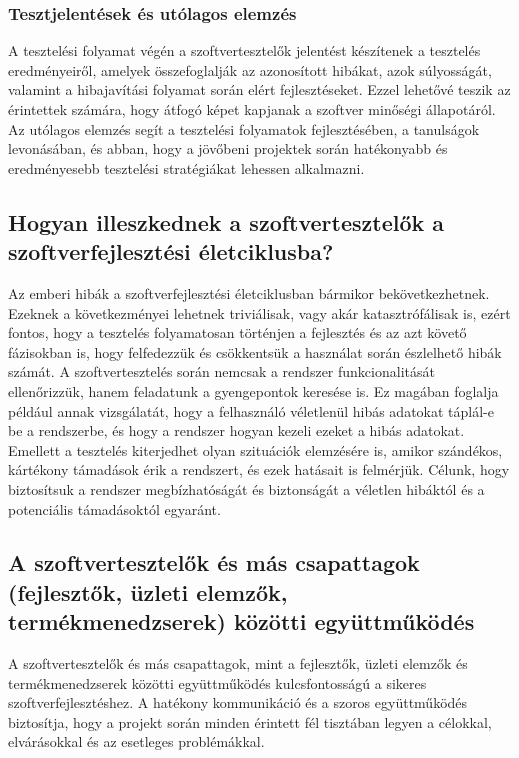 \subsubsection{Tesztjelentések és utólagos elemzés}
A tesztelési folyamat végén a szoftvertesztelők jelentést készítenek a tesztelés eredményeiről, amelyek összefoglalják az azonosított hibákat, azok súlyosságát, valamint a hibajavítási folyamat során elért fejlesztéseket. Ezzel lehetővé teszik az érintettek számára, hogy átfogó képet kapjanak a szoftver minőségi állapotáról. Az utólagos elemzés segít a tesztelési folyamatok fejlesztésében, a tanulságok levonásában, és abban, hogy a jövőbeni projektek során hatékonyabb és eredményesebb tesztelési stratégiákat lehessen alkalmazni.

\subsection{Hogyan illeszkednek a szoftvertesztelők a szoftverfejlesztési életciklusba?}
Az emberi hibák a szoftverfejlesztési életciklusban bármikor bekövetkezhetnek.
Ezeknek a következményei lehetnek triviálisak, vagy akár katasztrófálisak is, ezért fontos, hogy a tesztelés folyamatosan történjen a fejlesztés és az azt követő fázisokban is, hogy felfedezzük és csökkentsük a használat során észlelhető hibák számát.
A szoftvertesztelés során nemcsak a rendszer funkcionalitását ellenőrizzük, hanem feladatunk a gyengepontok keresése is. Ez magában foglalja például annak vizsgálatát, hogy a felhasználó véletlenül hibás adatokat táplál-e be a rendszerbe, és hogy a rendszer hogyan kezeli ezeket a hibás adatokat.
Emellett a tesztelés kiterjedhet olyan szituációk elemzésére is, amikor szándékos, kártékony támadások érik a rendszert, és ezek hatásait is felmérjük. Célunk, hogy biztosítsuk a rendszer megbízhatóságát és biztonságát a véletlen hibáktól és a potenciális támadásoktól egyaránt. \cite[9]{istqbfoundations}

\subsection{A szoftvertesztelők és más csapattagok (fejlesztők, üzleti elemzők, termékmenedzserek) közötti együttműködés}
A szoftvertesztelők és más csapattagok, mint a fejlesztők, üzleti elemzők és termékmenedzserek közötti együttműködés kulcsfontosságú a sikeres szoftverfejlesztéshez. A hatékony kommunikáció és a szoros együttműködés biztosítja, hogy a projekt során minden érintett fél tisztában legyen a célokkal, elvárásokkal és az esetleges problémákkal.

